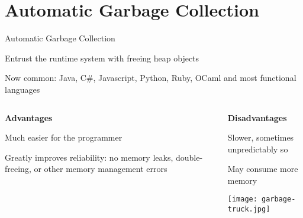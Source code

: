 \documentclass{plt}
\begin{document}
\part{Automatic Garbage Collection}
\frame{\partpage}

\begin{frame}{Automatic Garbage Collection}

Entrust the runtime system with freeing heap objects

Now common: Java, C\#, Javascript, Python, Ruby, OCaml and most
functional languages

\medskip

\begin{columns}[t]
\begin{column}{0.5\textwidth}
\baselineskip
\textbf{Advantages}

Much easier for the programmer

Greatly improves reliability: no memory leaks, double-freeing, or
other memory management errors
\end{column}
\begin{column}{0.5\textwidth}
\baselineskip
\textbf{Disadvantages}

Slower, sometimes unpredictably so

May consume more memory

\texttt{[image: garbage-truck.jpg]}

\end{column}
\end{columns}

\end{frame}
\end{document}
